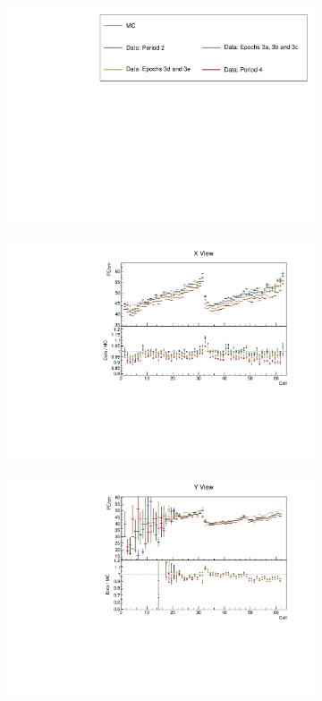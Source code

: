 \documentclass[12pt,a4paper]{article}
\begin{document}
\begin{figure}[h!]
  \begin{subfigure}{\textwidth}
  \centering
    \includegraphics[height=0.2\linewidth]{essentialsec_tb/legend.pdf}
  \end{subfigure}
  \vspace*{2mm}

  \begin{subfigure}{0.5\textwidth}
    \includegraphics[width=\linewidth]{essentialsec_tb/pecm_cell_x.pdf}
  \end{subfigure}
  \begin{subfigure}{0.5\textwidth}
    \includegraphics[width=\linewidth]{essentialsec_tb/pecm_cell_y.pdf}

\end{subfigure}
\end{figure}
\end{document}

